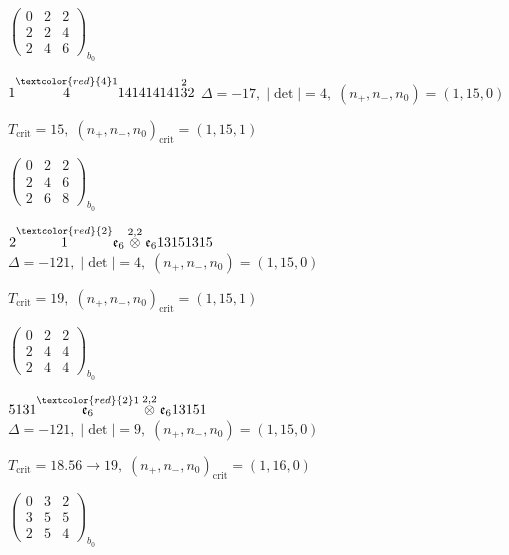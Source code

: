 \documentclass[10pt]{article}
\begin{document}
\hspace{2em}$\left(\begin{smallmatrix}0 & 2 & 2 \\ 2 & 2 & 4 \\ 2 & 4 & 6\end{smallmatrix}\right)_{\!b_0}$

\smallskip

$1\overset{\textcolor{red}{4}1}{4}141414141\overset{2}{3}2$ \quad $\Delta=-17,\; |\det|=4,\; (n_+,n_-,n_0)=(1,15,0)$

\hspace{1em}$T_{\text{crit}}=15,\; (n_+,n_-,n_0)_{\text{crit}}=(1,15,1)$

\hspace{2em}$\left(\begin{smallmatrix}0 & 2 & 2 \\ 2 & 4 & 6 \\ 2 & 6 & 8\end{smallmatrix}\right)_{\!b_0}$

\smallskip

$2\overset{\textcolor{red}{2}}{1}\mathfrak{e}_6\overset{2,2}{\otimes}\mathfrak{e}_613151315$ \quad $\Delta=-121,\; |\det|=4,\; (n_+,n_-,n_0)=(1,15,0)$

\hspace{1em}$T_{\text{crit}}=19,\; (n_+,n_-,n_0)_{\text{crit}}=(1,15,1)$

\hspace{2em}$\left(\begin{smallmatrix}0 & 2 & 2 \\ 2 & 4 & 4 \\ 2 & 4 & 4\end{smallmatrix}\right)_{\!b_0}$

\smallskip

$5131\overset{\textcolor{red}{2}1}{\mathfrak{e}_6}\overset{2,2}{\otimes}\mathfrak{e}_613151$ \quad $\Delta=-121,\; |\det|=9,\; (n_+,n_-,n_0)=(1,15,0)$

\hspace{1em}$T_{\text{crit}}=18.56 \to 19,\; (n_+,n_-,n_0)_{\text{crit}}=(1,16,0)$

\hspace{2em}$\left(\begin{smallmatrix}0 & 3 & 2 \\ 3 & 5 & 5 \\ 2 & 5 & 4\end{smallmatrix}\right)_{\!b_0}$
\end{document}
